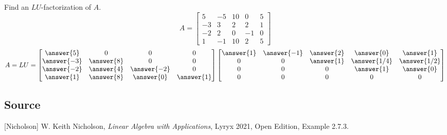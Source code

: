 \documentclass{ximera}
\author{}
\begin{document}
\begin{exercise}
Find an $LU$-factorization of $A$.
$$A=\begin{bmatrix}5 & -5 & 10 & 0 & 5\\-3 & 3 & 2 & 2 & 1\\-2 & 2 & 0 & -1 & 0\\1 & -1 & 10 & 2 & 5\end{bmatrix}$$ 
$$A=LU=\begin{bmatrix}\answer{5} & 0 & 0 & 0\\\answer{-3} & \answer{8} & 0 & 0\\\answer{-2} & \answer{4} & \answer{-2} & 0\\\answer{1} & \answer{8} & \answer{0} & \answer{1}\end{bmatrix}\begin{bmatrix}\answer{1} & \answer{-1} & \answer{2} & \answer{0} & \answer{1}\\0 & 0 & \answer{1} & \answer{1/4} & \answer{1/2}\\0 & 0 & 0 & \answer{1} & \answer{0}\\0 & 0 & 0 &0 & 0\end{bmatrix}$$
 \end{exercise}
 
 \subsection*{Source}
[Nicholson] W. Keith Nicholson, {\it Linear Algebra with Applications}, Lyryx 2021, Open Edition, Example 2.7.3.
\end{document}
